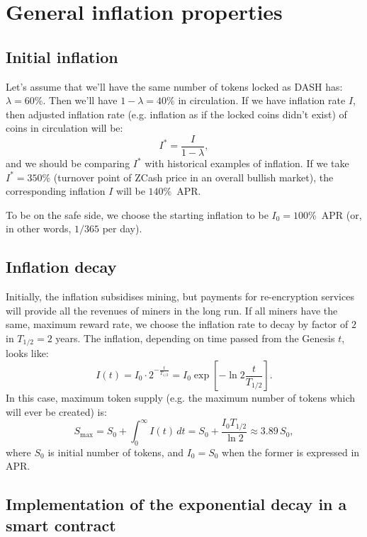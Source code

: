 \documentclass[longbibliography,nofootinbib,twocolumn]{revtex4-1}
\begin{document}
\section{General inflation properties}

\subsection{Initial inflation}

Let's assume that we'll have the same number of tokens locked as DASH has: $\lambda=60\%$.
Then we'll have $1-\lambda=40\%$ in circulation.
If we have inflation rate $I$, then adjusted inflation rate (e.g. inflation as if the locked coins didn't exist) of coins in circulation will be:
\begin{equation}
    I^* = \frac{I}{1-\lambda},
\end{equation}
and we should be comparing $I^*$ with historical examples of inflation.
If we take $I^*=350\%$ (turnover point of ZCash price in an overall bullish market), the corresponding inflation $I$ will be $140\%$~APR.

To be on the safe side, we choose the starting inflation to be $I_0=100\%$~APR (or, in other words, $1/365$ per day).

\subsection{Inflation decay}

Initially, the inflation subsidises mining, but payments for re-encryption services will provide all the revenues of miners in the long run.
If all miners have the same, maximum reward rate, we choose the inflation rate to decay by factor of $2$ in $T_{1/2} = 2$ years.
The inflation, depending on time passed from the Genesis $t$, looks like:
\begin{equation}
    I(t) = I_0 \cdot 2^{-\frac{t}{T_{1/2}}} = I_0 \exp\left[ -\ln{2} \frac{t}{T_{1/2}} \right].
\end{equation}
In this case, maximum token supply (e.g. the maximum number of tokens which will ever be created) is:
\begin{equation}
    S_{\max} = S_0 + \int_0^{\infty} I(t)\, dt = S_0 + \frac{I_0 T_{1/2}}{\ln{2}} \approx 3.89\, S_0,
\end{equation}
where $S_0$ is initial number of tokens, and $I_0 = S_0$ when the former is expressed in APR.

\subsection{Implementation of the exponential decay in a smart contract}
\end{document}

